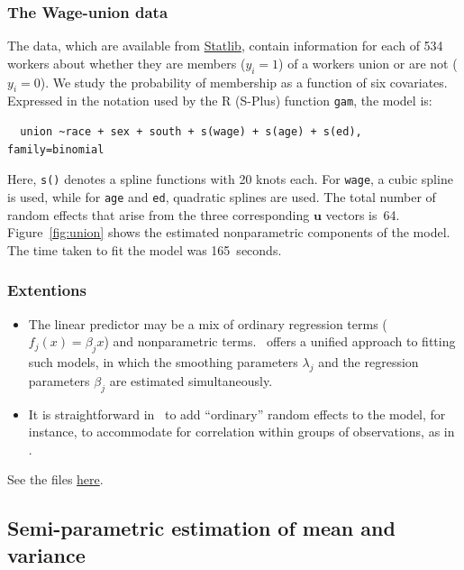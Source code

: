\documentclass{admbmanual}
\newcommand{\citeasnoun}{\cite}
\begin{document}
\subsubsection{The Wage-union data}

The data, which are available from \href{lib.stat.cmu.edu/}{Statlib}, contain
information for each of 534 workers about whether they are members ($y_{i}=1$)
of a workers union or are not ($y_{i}=0$). We study the probability of
membership as a function of six covariates. Expressed in the notation used by
the R (S-Plus) function \texttt{gam}, the model is:
\begin{verbatim}
  union ~race + sex + south + s(wage) + s(age) + s(ed), family=binomial
\end{verbatim}

Here, \texttt{s()} denotes a spline functions with 20 knots each. For
\texttt{wage}, a cubic spline is used, while for \texttt{age} and \texttt{ed},
quadratic splines are used. The total number of random effects that arise from
the three corresponding $\mathbf{u}$ vectors is~64. Figure~\ref{fig:union} shows
the estimated nonparametric components of the model. The time taken to fit the
model was 165~seconds.

\subsubsection{Extentions}

\begin{itemize}
  \item The linear predictor may be a mix of ordinary regression terms
  ($f_{j}(x)=\beta _{j}x$) and nonparametric terms. \scAR\ offers a unified
  approach to fitting such models, in which the smoothing parameters $\lambda
  _{j}$ and the regression parameters $\beta _{j}$ are estimated simultaneously.

  \item It is straightforward in \scAR\ to add ``ordinary'' random effects to
  the model, for instance, to accommodate for correlation within groups of
  observations, as in \citeasnoun{lin:zhan:1999}.
\end{itemize}

See the files
\href{http://otter-rsch.com/admbre/examples/union/union.html}{here}.

\subsection{Semi-parametric estimation of mean and variance}
\label{sec:lidar}
\end{document}
